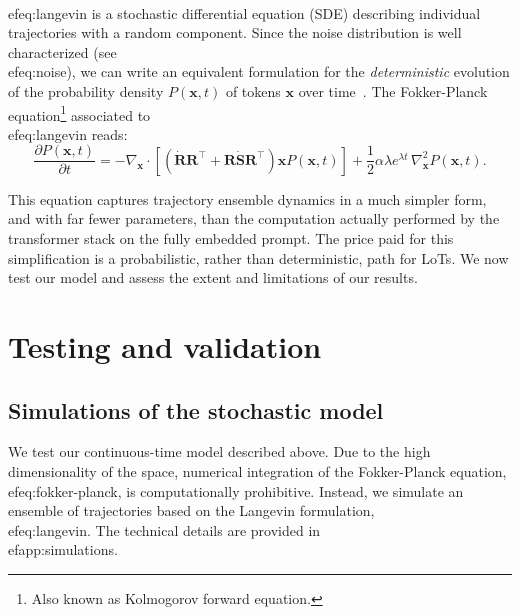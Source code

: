 \documentclass{article} %
\def\vx{{\bm{x}}}
\def\mR{{\bm{R}}}
\def\mS{{\bm{S}}}
\def\mU{{\bm{U}}}
\newcommand{\nb}[1]{{\color{teal} NB: #1}} %
\begin{document}
\\ef{eq:langevin} is a stochastic differential equation (SDE) describing individual trajectories with a random component.
Since the noise distribution is well characterized (see \\ef{eq:noise}), we can write an equivalent formulation for the \emph{deterministic} evolution of the probability density $P(\vx,t)$ of tokens $\vx$ over time~\citep{pavliotis2014stochastic}.
The Fokker-Planck equation\footnote{
Also known as Kolmogorov forward equation.
} 
associated to \\ef{eq:langevin} reads: 
\begin{equation}\label{eq:fokker-planck}
    \frac{\partial P(\vx, t)}{\partial t} = -\nabla_{\vx} \cdot \left[ \left( \dot{\mR} \mR^{\top} + \mR \dot{\mS} \mR^{\top}  \right) \vx P(\vx, t) \right] + \frac{1}{2} \alpha \lambda e^{\lambda t} \, \nabla_{\vx}^2 P(\vx, t).
\end{equation}

This equation captures trajectory ensemble dynamics in a much simpler form, and with far fewer parameters, than the computation actually performed by the transformer stack on the fully embedded prompt.
The price paid for this simplification is a probabilistic, rather than deterministic, path for LoTs.
We now test our model and assess the extent and limitations of our results.



\section{Testing and validation}

\subsection{Simulations of the stochastic model}
We test our continuous-time model described above.
Due to the high dimensionality of the space, numerical integration of the Fokker-Planck equation, \\ef{eq:fokker-planck}, is computationally prohibitive.
Instead, we simulate an ensemble of trajectories based on the Langevin formulation, \\ef{eq:langevin}.
The technical details are provided in \\ef{app:simulations}.
\end{document}
